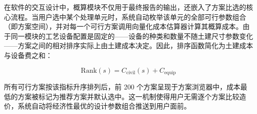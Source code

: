 \documentclass[12pt,a4paper]{ctexart}
\begin{document}
在软件的交互设计中，概算模块不仅用于最终报告的输出，还嵌入了方案比选的核心流程。当用户选中某个处理单元时，系统自动枚举该单元的全部可行参数组合（即方案空间），并对每一个可行方案调用向量化成本估算器计算其概算成本。由于同一模块的工艺设备配置是固定的——设备的种类和数量不随土建尺寸参数变化——方案之间的相对排序实际上由土建成本决定。因此，排序函数简化为土建成本与设备费之和：

\begin{equation}
\text{Rank}(s) = C_{\text{civil}}(s) + C_{\text{equip}}
\end{equation}

所有可行方案按该指标升序排列后，前 200 个方案呈现于方案浏览器中，成本最低的方案被标记为推荐方案并默认选中。这一机制使得用户无需逐个方案比较造价，系统自动将经济性最优的设计参数组合推送到用户面前。
\end{document}

